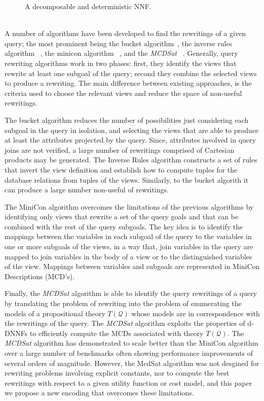 \documentclass{article}
\newcommand{\Q}{\mathcal{Q}}
\newcommand{\Theory}[1]{T(#1)}
\begin{document}
{\begin{description}
\begin{figure}
\centering
\caption{A decomposable and deterministic NNF.}
\label{fig:dnnf}
\end{figure}


\item[Query Rewriting Solutions] \mbox{}\\
A number of algorithms have been developed to find the rewritings of a given query; the most prominent being the bucket algorithm~\cite{levy:bucket},  the inverse rules algorithm ~\cite{duschka:answer,Qian96}, the minicon algorithm ~\cite{pottinger:minicon}, and the {\it MCDSat} ~\cite{arvelo:aaai06}. Generally, query rewriting algorithms work in two phases: first, they identify the views that rewrite at least one  subgoal of the query; second they combine the selected views to produce a rewriting. The main difference between existing approaches, is the criteria used to choose the relevant views and reduce the space of non-useful rewritings.

The bucket algorithm reduces the number of possibilities just considering each subgoal in the query in isolation, and selecting the views that are able to  produce at least the attributes projected by the query. Since, attributes involved in query joins are not verified, a large number of rewritings comprised of  Cartesian products may  be generated. 	
The Inverse Rules algorithm constructs a set of rules that invert the view definition and establish how to compute tuples for the database relations from tuples of the views. Similarly, to the bucket algorith it can produce a large number non-useful of rewritings. 

The MiniCon algorithm  overcomes the limitations of the previous algorithms by identifying only views that rewrite a set of the query goals and that  can be combined with the rest of the query subgoals. The key idea is to identify the mappings between  the variables in each subgoal of the query to the variables  in one or more subgoals of the views, in a way that, join variables in the query are mapped to join variables in the body of a view or to the distinguished variables of the view. Mappings between variables and subgoals are represented in MiniCon Descriptions (MCD's)\cite{pottinger:minicon}.

Finally,  the
{\it MCDSat} algorithm is able to identify the query rewritings of a query by translating the problem of rewriting
into the problem of enumerating the models of a propositional
theory  $\Theory{\Q}$ whose models are in correspondence
with the rewritings of the query. 
The {\it MCDSat} algorithm exploits the properties of d-DNNFs to efficiently 
compute the MCDs associated with theory $\Theory{\Q}$.
The  {\it MCDSat} algorithm has demonstrated to scale better than the MiniCon
algorithm over a large number of benchmarks often showing performance
improvements of several orders of magnitude. However, the McdSat algorithm was not desgined for rewriting problems involving explicit constants,
nor to compute the best rewritings with respect to a given utility function or cost model, and this paper we propose a new encoding  that overcomes these limitations.



\end{description}}
\end{document}
